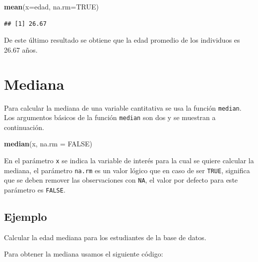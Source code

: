 \documentclass[10pt,]{krantz}
\makeatletter
\newenvironment{Shaded}{\begin{snugshade}}{\end{snugshade}}
\newcommand{\KeywordTok}[1]{\textcolor[rgb]{0.13,0.29,0.53}{\textbf{{#1}}}}
\newcommand{\DataTypeTok}[1]{\textcolor[rgb]{0.13,0.29,0.53}{{#1}}}
\newcommand{\OtherTok}[1]{\textcolor[rgb]{0.56,0.35,0.01}{{#1}}}
\newcommand{\NormalTok}[1]{{#1}}
\newenvironment{kframe}{%
\medskip{}
\setlength{\fboxsep}{.8em}
 \def\at@end@of@kframe{}%
 \ifinner\ifhmode%
  \def\at@end@of@kframe{\end{minipage}}%
  \begin{minipage}{\columnwidth}%
 \fi\fi%
 \def\FrameCommand##1{\hskip\@totalleftmargin \hskip-\fboxsep
 \colorbox{shadecolor}{##1}\hskip-\fboxsep
     \hskip-\linewidth \hskip-\@totalleftmargin \hskip\columnwidth}%
 \MakeFramed {\advance\hsize-\width
   \@totalleftmargin\z@ \linewidth\hsize
   \@setminipage}}%
 {\par\unskip\endMakeFramed%
 \at@end@of@kframe}
\renewenvironment{Shaded}{\begin{kframe}}{\end{kframe}}
\makeatother
\begin{document}
\begin{Shaded}
\begin{Highlighting}[]
\KeywordTok{mean}\NormalTok{(}\DataTypeTok{x=}\NormalTok{edad, }\DataTypeTok{na.rm=}\OtherTok{TRUE}\NormalTok{)}
\end{Highlighting}
\end{Shaded}

\begin{verbatim}
## [1] 26.67
\end{verbatim}

De este último resultado se obtiene que la edad promedio de los
individuos es 26.67 años.

\section{\texorpdfstring{Mediana 
}{Mediana  }}\label{mediana}

Para calcular la mediana de una variable cantitativa se usa la función
\texttt{median}. Los argumentos básicos de la función \texttt{median}
son dos y se muestran a continuación.

\begin{Shaded}
\begin{Highlighting}[]
\KeywordTok{median}\NormalTok{(x, }\DataTypeTok{na.rm =} \OtherTok{FALSE}\NormalTok{)}
\end{Highlighting}
\end{Shaded}

En el parámetro \texttt{x} se indica la variable de interés para la cual
se quiere calcular la mediana, el parámetro \texttt{na.rm} es un valor
lógico que en caso de ser \texttt{TRUE}, significa que se deben remover
las observaciones con \texttt{NA}, el valor por defecto para este
parámetro es \texttt{FALSE}.

\subsection*{Ejemplo}\label{ejemplo-3}


Calcular la edad mediana para los estudiantes de la base de datos.

Para obtener la mediana usamos el siguiente código:

\begin{Shaded}
\end{Shaded}
\end{document}
